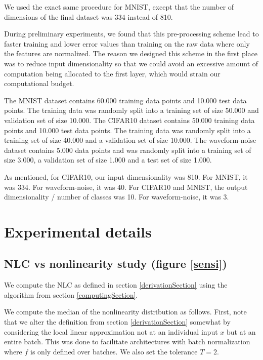 \documentclass{article} %
\begin{document}
We used the exact same procedure for MNIST, except that the number of dimensions of the final dataset was 334 instead of 810.

During preliminary experiments, we found that this pre-processing scheme lead to faster training and lower error values than training on the raw data where only the features are normalized. The reason we designed this scheme in the first place was to reduce input dimensionality so that we could avoid an excessive amount of computation being allocated to the first layer, which would strain our computational budget.

The MNIST dataset contains 60.000 training data points and 10.000 test data points. The training data was randomly split into a training set of size 50.000 and validation set of size 10.000. The CIFAR10 dataset contains 50.000 training data points and 10.000 test data points. The training data was randomly split into a training set of size 40.000 and a validation set of size 10.000. The waveform-noise dataset contains 5.000 data points and was randomly split into a training set of size 3.000, a validation set of size 1.000 and a test set of size 1.000.

As mentioned, for CIFAR10, our input dimensionality was 810. For MNIST, it was 334. For waveform-noise, it was 40. For CIFAR10 and MNIST, the output dimensionality / number of classes was 10. For waveform-noise, it was 3.


\section{Experimental details} \label{detailsSection}

\subsection{NLC vs nonlinearity study (figure \ref{sensi})} \label{sensiDetails}

We compute the NLC as defined in section \ref{derivationSection} using the algorithm from section \ref{computingSection}.

We compute the median of the nonlinearity distribution as follows. First, note that we alter the definition from section \ref{derivationSection} somewhat by considering the local linear approximation not at an individual input $x$ but at an entire batch. This was done to facilitate architectures with batch normalization where $f$ is only defined over batches. We also set the tolerance $T = 2$. 
\end{document}
